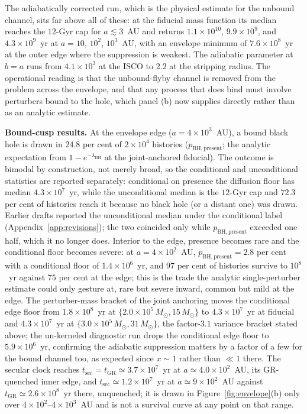 \documentclass[11pt]{article}
\newcommand{\msun}{\ensuremath{M_\odot}}
\begin{document}
The adiabatically corrected run, which is the physical estimate for the unbound channel, sits far above all of these: at the fiducial mass function its median reaches the $12$-Gyr cap for $a \lesssim 3$~AU and returns $1.1\times10^{10}$, $9.9\times10^{9}$, and $4.3\times10^{9}$~yr at $a = 10$, $10^{2}$, $10^{3}$~AU, with an envelope minimum of $7.6\times10^{8}$~yr at the outer edge where the suppression is weakest. The adiabatic parameter at $b = a$ runs from $4.1\times10^{3}$ at the ISCO to $2.2$ at the stripping radius. The operational reading is that the unbound-flyby channel is removed from the problem across the envelope, and that any process that does bind must involve perturbers bound to the hole, which panel (b) now supplies directly rather than as an analytic estimate.

\textbf{Bound-cusp results.} At the envelope edge ($a = 4\times10^{3}$~AU), a bound black hole is drawn in $24.8$ per cent of $2\times10^{4}$ histories ($p_{\mathrm{BH,present}}$; the analytic expectation from $1 - e^{-\lambda_{\mathrm{BH}}}$ at the joint-anchored fiducial). The outcome is bimodal by construction, not merely broad, so the conditional and unconditional statistics are reported separately: conditional on presence the diffusion floor has median $4.3\times10^{7}$~yr, while the unconditional median is the $12$-Gyr cap and $72.3$ per cent of histories reach it because no black hole (or a distant one) was drawn. Earlier drafts reported the unconditional median under the conditional label (Appendix~\ref{app:revisions}); the two coincided only while $p_{\mathrm{BH,present}}$ exceeded one half, which it no longer does. Interior to the edge, presence becomes rare and the conditional floor becomes severe: at $a = 4\times10^{2}$~AU, $p_{\mathrm{BH,present}} = 2.8$ per cent with a conditional floor of $1.4\times10^{6}$~yr, and $97$ per cent of histories survive to $10^{8}$~yr against $75$ per cent at the edge; this is the trade the analytic single-perturber estimate could only gesture at, rare but severe inward, common but mild at the edge. The perturber-mass bracket of the joint anchoring moves the conditional edge floor from $1.8\times10^{8}$~yr at $\{2.0\times10^{5}\,\msun, 15\,\msun\}$ to $4.3\times10^{7}$~yr at fiducial and $4.3\times10^{7}$~yr at $\{3.0\times10^{5}\,\msun, 31\,\msun\}$, the factor-$3.1$ variance bracket stated above; the un-kerneled diagnostic run drops the conditional edge floor to $5.9\times10^{6}$~yr, confirming the adiabatic suppression matters by a factor of a few for the bound channel too, as expected since $x \sim 1$ rather than $\ll 1$ there. The secular clock reaches $t_{\mathrm{sec}} = t_{\mathrm{GR}} \simeq 3.7\times10^{7}$~yr at $a \simeq 4.0\times10^{2}$~AU, its GR-quenched inner edge, and $t_{\mathrm{sec}} \simeq 1.2\times10^{7}$~yr at $a \simeq 9\times10^{2}$~AU against $t_{\mathrm{GR}} \simeq 2.6\times10^{8}$~yr there, unquenched; it is drawn in Figure~\ref{fig:envelope}(b) only over $4\times10^{2}$--$4\times10^{3}$~AU and is not a survival curve at any point on that range.
\end{document}
